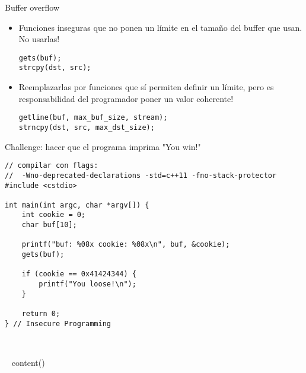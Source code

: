 \begin{frame}[fragile]{Buffer overflow}{}
   \begin{itemize}
      \item Funciones inseguras que no ponen un l\'imite en el tama\~no del buffer que usan. No usarlas!
         \begin{lstlisting}[style=normal]
gets(buf);
strcpy(dst, src);
         \end{lstlisting}

     \item Reemplazarlas por funciones que s\'i permiten definir un l\'imite, pero es responsabilidad del programador poner un valor coherente! 
         \begin{lstlisting}[style=normal]
getline(buf, max_buf_size, stream);
strncpy(dst, src, max_dst_size);
         \end{lstlisting}
   \end{itemize}
\end{frame}
\begin{frame}[fragile]{Challenge: hacer que el programa imprima "You win!"}
         \begin{lstlisting}[style=normal]
// compilar con flags:
//  -Wno-deprecated-declarations -std=c++11 -fno-stack-protector
#include <cstdio>

int main(int argc, char *argv[]) {
    int cookie = 0;
    char buf[10];

    printf("buf: %08x cookie: %08x\n", buf, &cookie);
    gets(buf);

    if (cookie == 0x41424344) {
        printf("You loose!\n");
    }

    return 0;
} // Insecure Programming
         \end{lstlisting}
\end{frame}

~%

~{ content() }~




